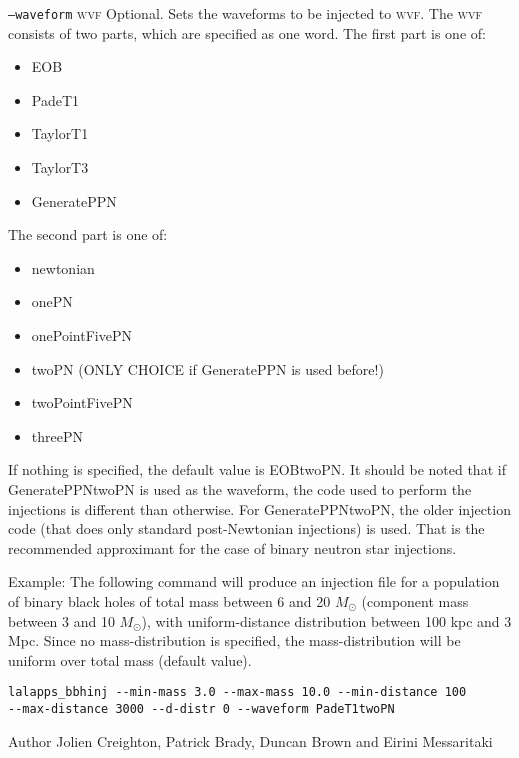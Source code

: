 \begin{entry}
\begin{entry}
\item[\texttt{--waveform} \textsc{wvf}] Optional. Sets the waveforms to 
be injected to \textsc{wvf}. The \textsc{wvf} consists of two parts,
which are specified as one word. The first part is one of:
  \begin{itemize}
  \item EOB
  \item PadeT1
  \item TaylorT1
  \item TaylorT3
  \item GeneratePPN
  \end{itemize}
The second part is one of:
  \begin{itemize}
  \item newtonian
  \item onePN
  \item onePointFivePN
  \item twoPN (ONLY CHOICE if GeneratePPN is used before!)
  \item twoPointFivePN
  \item threePN
  \end{itemize}
If nothing is specified, the default value is EOBtwoPN. It should be noted 
that if GeneratePPNtwoPN is used as the waveform, the code used to
perform the injections is different than otherwise. For GeneratePPNtwoPN, the
older injection code (that does only standard post-Newtonian injections) is
used. That is the recommended approximant for the case of binary neutron
star injections.

\end{entry}

\item[Example:] 
The following command will produce an injection file for a population 
of binary black holes of total mass between 6 and 20 $M_\odot$ (component
mass between 3 and 10 $M_\odot$), with uniform-distance distribution
between 100 kpc and 3 Mpc. Since no mass-distribution is specified, the 
mass-distribution will be uniform over total mass (default value).
\begin{verbatim}
lalapps_bbhinj --min-mass 3.0 --max-mass 10.0 --min-distance 100 
--max-distance 3000 --d-distr 0 --waveform PadeT1twoPN
\end{verbatim}

\item[Author]
Jolien Creighton, Patrick Brady, Duncan Brown and Eirini Messaritaki
\end{entry}
